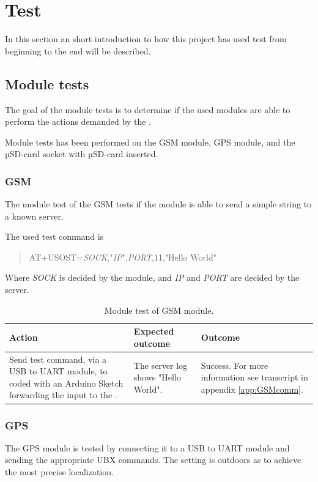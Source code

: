 
\chapter{Test}
In this section an short introduction to how this project has used test from beginning to the end will be described.

\section{Module tests}
The goal of the module tests is to determine if the used modules are able to perform the actions demanded by the .

Module tests has been performed on the \SARA GSM module, \GPS GPS module, and the \SDsock µSD-card socket with µSD-card inserted.

\subsection{GSM \SARA}
The module test of the GSM \SARA tests if the module is able to send a simple string to a known server.

The used test command is
\begin{quote}
	AT+USOST=\textit{SOCK},"\textit{IP}",\textit{PORT},11,"Hello World"
\end{quote}
Where \textit{SOCK} is decided by the \SARA module, and \textit{IP} and \textit{PORT} are decided by the server.

\begin{table}[H]
	\centering
	\begin{tabularx}{\textwidth}{p{4.3cm} X X}
		\toprule
		\textbf{Action} & \textbf{Expected outcome} & \textbf{Outcome} \\
		\midrule
		Send test command, via a USB to UART module, to \MKR coded with an Arduino Sketch forwarding the input to the \SARA. & The server log shows "Hello World". & Success. For more information see transcript in appendix \cref{app:GSMcomm}. \\
		\bottomrule
	\end{tabularx}
	\caption{Module test of \SARA GSM module.}
	\label{AT:modGSM}
\end{table}

\subsection{GPS \GPS}
The GPS module is tested by connecting it to a USB to UART module and sending the appropriate UBX commands. The setting is outdoors as to achieve the most precise localization.

